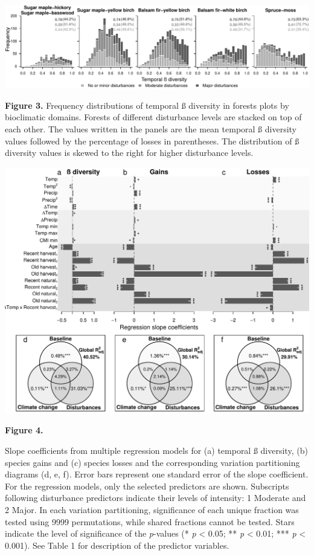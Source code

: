 \documentclass[a4paperpaper,]{article}
\begin{document}
\pagebreak

\includegraphics[width=6.7in,height=\textheight]{ms/figures/fig3_hist.pdf}

\textbf{Figure 3.} Frequency distributions of temporal ß diversity in
forests plots by bioclimatic domains. Forests of different disturbance
levels are stacked on top of each other. The values written in the
panels are the mean temporal ß diversity values followed by the
percentage of losses in parentheses. The distribution of ß diversity
values is skewed to the right for higher disturbance levels.

\pagebreak

\includegraphics[width=6.6in,height=\textheight]{ms/figures/fig4_reg.pdf}

\textbf{Figure 4.}

Slope coefficients from multiple regression models for (a) temporal ß
diversity, (b) species gains and (c) species losses and the
corresponding variation partitioning diagrams (d, e, f). Error bars
represent one standard error of the slope coefficient. For the
regression models, only the selected predictors are shown. Subscripts
following disturbance predictors indicate their levels of intensity: 1
Moderate and 2 Major. In each variation partitioning, significance of
each unique fraction was tested using 9999 permutations, while shared
fractions cannot be tested. Stars indicate the level of significance of
the \emph{p}-values (* \emph{p} \textless{} 0.05; ** \emph{p}
\textless{} 0.01; *** \emph{p} \textless{} 0.001). See Table 1 for
description of the predictor variables.
\end{document}

